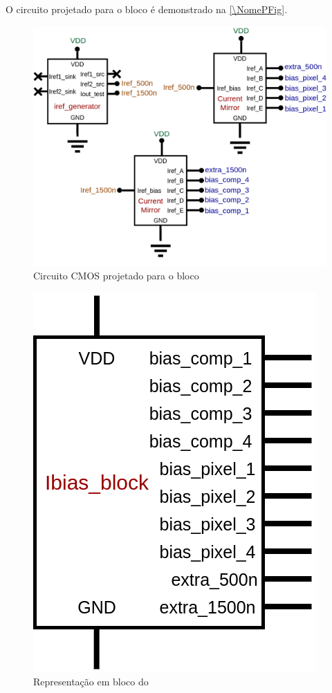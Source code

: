 O circuito projetado para o bloco \'e demonstrado na \autoref{\NomePFig}.

\begin{figure}[htb]
 \label{NomePFig}
 \centering
    \centering
    \caption{Circuito CMOS projetado para o bloco \NomeBloco} \label{\NomePFig}
    \includegraphics[scale=0.3]{Circuitos/ibias_block.png}
\end{figure}

\begin{figure}[htb]
 \label{NomeSFig}
 \centering
    \centering
    \caption{Representa{\c c}\~ao em bloco do \NomeBloco} \label{NomeSFig}
    \includegraphics[scale=0.3]{Circuitos/ibias_block_block.png}
\end{figure}
